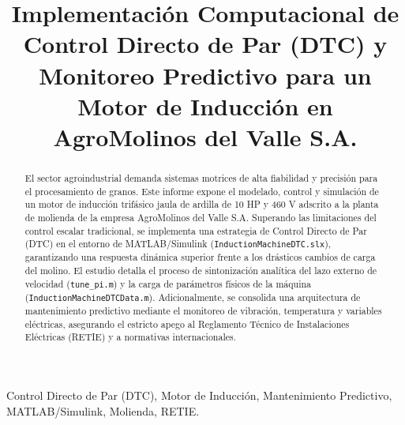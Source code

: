 \documentclass[conference]{IEEEtran}
\begin{document}
\title{Implementación Computacional de Control Directo de Par (DTC) y Monitoreo Predictivo para un Motor de Inducción en AgroMolinos del Valle S.A.}

\author{
}

\maketitle

\renewcommand\abstractname{Resumen}
\begin{abstract}
El sector agroindustrial demanda sistemas motrices de alta fiabilidad y precisión para el procesamiento de granos. Este informe expone el modelado, control y simulación de un motor de inducción trifásico jaula de ardilla de 10 HP y 460 V adscrito a la planta de molienda de la empresa AgroMolinos del Valle S.A. Superando las limitaciones del control escalar tradicional, se implementa una estrategia de Control Directo de Par (DTC) en el entorno de MATLAB/Simulink (\texttt{InductionMachineDTC.slx}), garantizando una respuesta dinámica superior frente a los drásticos cambios de carga del molino. El estudio detalla el proceso de sintonización analítica del lazo externo de velocidad (\texttt{tune\_pi.m}) y la carga de parámetros físicos de la máquina (\texttt{InductionMachineDTCData.m}). Adicionalmente, se consolida una arquitectura de mantenimiento predictivo mediante el monitoreo de vibración, temperatura y variables eléctricas, asegurando el estricto apego al Reglamento Técnico de Instalaciones Eléctricas (RETIE) y a normativas internacionales.
\end{abstract}

\renewcommand\IEEEkeywordsname{Palabras clave}
\begin{IEEEkeywords}
Control Directo de Par (DTC), Motor de Inducción, Mantenimiento Predictivo, MATLAB/Simulink, Molienda, RETIE.
\end{IEEEkeywords}
\end{document}
